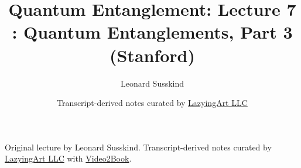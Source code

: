 \documentclass[11pt,oneside]{book}
\begin{document}
\frontmatter
\title{Quantum Entanglement: Lecture 7 : Quantum Entanglements, Part 3 (Stanford)}
\author{Leonard Susskind}
\date{Transcript-derived notes curated by \href{https://lazying.art}{LazyingArt LLC}}
\maketitle
\begin{center}
\small Original lecture by Leonard Susskind. Transcript-derived notes curated by \href{https://lazying.art}{LazyingArt LLC} with \href{https://github.com/lachlanchen/Video2Book}{Video2Book}.
\end{center}
\clearpage
\mainmatter

\end{document}

